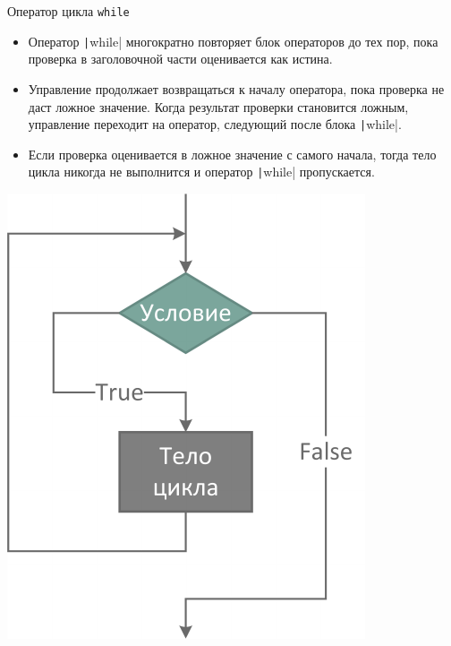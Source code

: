 \documentclass[aspectratio=169, mathserif]{beamer}	%
\begin{document}
\begin{frame}[fragile]{Оператор цикла \texttt{while}}

\scriptsize
\begin{multicols}{2}
\begin{itemize}
	\item Оператор \texttt|while| многократно повторяет блок операторов до тех пор, пока проверка в заголовочной части оценивается как истина.
	
	\item Управление продолжает возвращаться к началу оператора, пока проверка не даст ложное значение. Когда результат проверки становится ложным, управление переходит на оператор, следующий после блока \texttt|while|.
	
	\item Если проверка оценивается в ложное значение с самого начала, тогда тело цикла никогда не выполнится и оператор \texttt|while| пропускается.
\end{itemize}
\columnbreak
\centering
\includegraphics[width=.8\linewidth]{pics/while}
\end{multicols}
\vfill
\end{frame}
\end{document}
